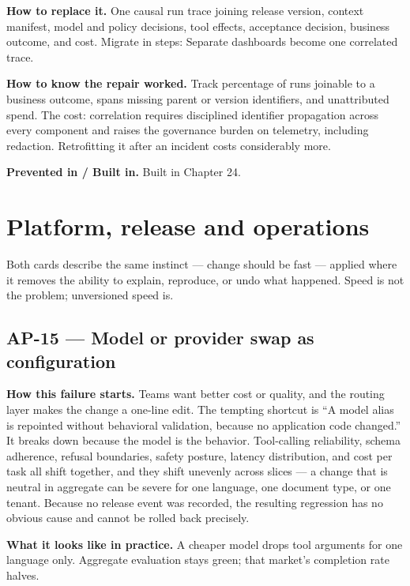 \textbf{How to replace it.} One causal run trace joining release version, context manifest, model and policy decisions, tool effects, acceptance decision, business outcome, and cost. Migrate in steps: Separate dashboards become one correlated trace.\par

\textbf{How to know the repair worked.} Track percentage of runs joinable to a business outcome, spans missing parent or version identifiers, and unattributed spend. The cost: correlation requires disciplined identifier propagation across every component and raises the governance burden on telemetry, including redaction. Retrofitting it after an incident costs considerably more.\par

\textbf{Prevented in / Built in.} Built in Chapter 24.\par

\section{Platform, release and operations}

Both cards describe the same instinct — change should be fast — applied where it removes the ability to explain, reproduce, or undo what happened. Speed is not the problem; unversioned speed is.\par

\subsection{AP-15 — Model or provider swap as configuration}

\textbf{How this failure starts.} Teams want better cost or quality, and the routing layer makes the change a one-line edit. The tempting shortcut is “A model alias is repointed without behavioral validation, because no application code changed.” It breaks down because the model is the behavior. Tool-calling reliability, schema adherence, refusal boundaries, safety posture, latency distribution, and cost per task all shift together, and they shift unevenly across slices — a change that is neutral in aggregate can be severe for one language, one document type, or one tenant. Because no release event was recorded, the resulting regression has no obvious cause and cannot be rolled back precisely.\par

\textbf{What it looks like in practice.} A cheaper model drops tool arguments for one language only. Aggregate evaluation stays green; that market's completion rate halves.\par

